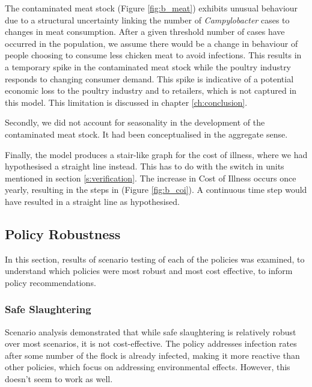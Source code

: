 The contaminated meat stock (Figure \ref{fig:b_meat}) exhibits unusual behaviour due to a structural uncertainty linking the number of \textit{Campylobacter} cases to changes in meat consumption. After a given threshold number of cases have occurred in the population, we assume there would be a change in behaviour of people choosing to consume less chicken meat to avoid infections. This results in a temporary spike in the contaminated meat stock while the poultry industry responds to changing consumer demand. This spike is indicative of a potential economic loss to the poultry industry and to retailers, which is not captured in this model. This limitation is discussed in chapter \ref{ch:conclusion}.

Secondly, we did not account for seasonality in the development of the contaminated meat stock. It had been conceptualised in the aggregate sense. 

Finally, the model produces a stair-like graph for the cost of illness, where we had hypothesised a straight line instead. This has to do with the switch in units mentioned in section \ref{s:verification}. The increase in Cost of Illness occurs once yearly, resulting in the steps in (Figure \ref{fig:b_coi}). A continuous time step would have resulted in a straight line as hypothesised. 

\subsection{Policy Robustness}
In this section, results of scenario testing of each of the policies was examined, to understand which policies were most robust and most cost effective, to inform policy recommendations.

\subsubsection{Safe Slaughtering}
\label{sec: safe slaughtering}
Scenario analysis demonstrated that while safe slaughtering is relatively robust over most scenarios, it is not cost-effective. The policy addresses infection rates after some number of the flock is already infected, making it more reactive than other policies, which focus on addressing environmental effects. However, this doesn't seem to work as well. 

